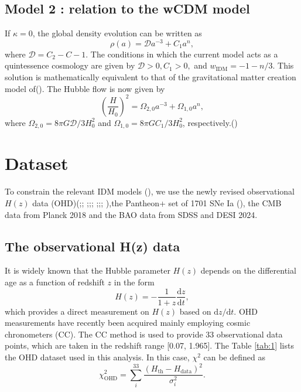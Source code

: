 \documentclass{aa}
\begin{document}
\subsection{Model 2 : relation to the wCDM model}

   If $\kappa=0$, the global density evolution can be written as
   \begin{equation}
      \rho(a)=\mathcal{D}a^{-3}+C_1a^{n},
   \end{equation}
   where $\mathcal{D}=C_2-C-1$. The conditions in which the current 
   model acts as a quintessence cosmology are given by $\mathcal{D}>0,
   C_1>0,$ and $w_{\text{IDM}}=-1-n/3$. This solution is mathematically
   equivalent to that of the gravitational matter creation model of().
   The Hubble flow is now given by
   \begin{equation}
      \left(\frac{H}{H_0}\right)^2=\Omega_{2,0}a^{-3}+\Omega_{1,0}a^{n},
   \end{equation}
   where $\Omega_{2,0}=8\pi G\mathcal{D}/3H_0^2$ and 
   $\Omega_{1,0}=8\pi GC_1/3H_0^2$, respectively.(\cite{refId0})
   
\section{Dataset}

   To constrain the relevant IDM models (\cite{refId0}), we use the newly revised
   observational $H(z)$ data (OHD)(\cite{Zhang_2014};\cite{PhysRevD.71.123001};
   \cite{Daniel.Stern_2010};\cite{M.Moresco_2012};\cite{Moresco_2016};
   \cite{10.1093/mnras/stx301};\cite{10.1093/mnrasl/slv037};\cite{Borghi_2022};
   \cite{Jiao_2023}),the Pantheon+ set of 1701 SNe Ia (\cite{Scolnic_2022}), the CMB data from
   Planck 2018 and the BAO data from SDSS and DESI 2024.

\subsection{The observational H(z) data}

   It is widely known that the Hubble parameter $H(z)$ depends on
   the differential age as a function of redshift $z$ in the form
   \begin{equation}
      H(z)=-\frac{1}{1+z}\frac{\mathrm{d}z}{\mathrm{d}t},
   \end{equation}
   which provides a direct measurement on $H(z)$ based on
   $\mathrm{d}z/\mathrm{d}t$.
   OHD measurements have recently been acquired mainly employing
   cosmic chronometers (CC). The CC method is used to provide 33 observational
   data points, which are taken in the redshift range [0.07, 1.965].
   The Table \ref{tab:1} lists the OHD dataset used in this analysis.
   In this case, $\chi^2$ can be defined as
   \begin{equation}
      \chi_{\text{OHD}}^2=\sum_i^{33}\frac{(H_{\text{th}}-H_{\text{data}})^2}{\sigma_i^2}.
   \end{equation}
\end{document}
